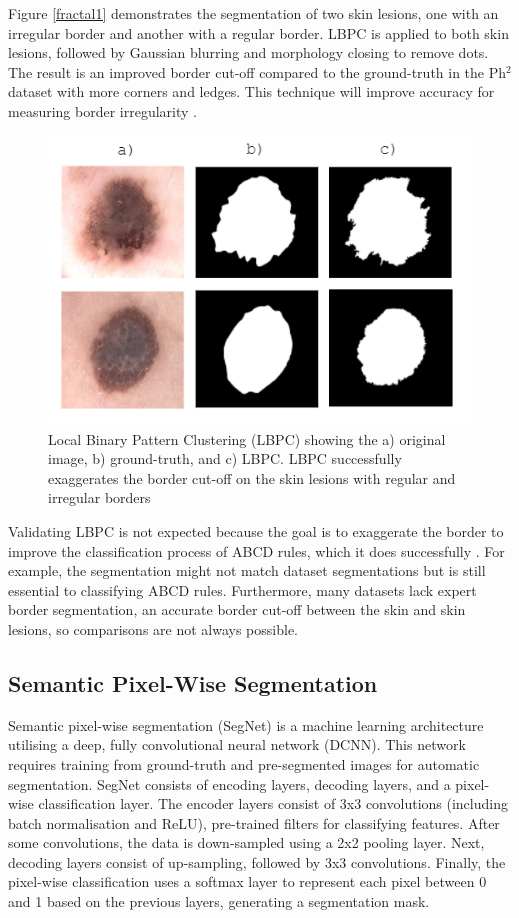 Figure \ref{fractal1} demonstrates the segmentation of two skin lesions, one with an irregular border and another with a regular border. LBPC is applied to both skin lesions, followed by Gaussian blurring and morphology closing to remove dots. The result is an improved border cut-off compared to the ground-truth in the Ph$^2$ dataset with more corners and ledges. This technique will improve accuracy for measuring border irregularity \cite{Pereira2020}.

\begin{figure}
\centering
\includegraphics[scale=1.2]{images/borders.PNG}
\caption{Local Binary Pattern Clustering (LBPC) showing the a) original image, b) ground-truth, and c) LBPC. LBPC successfully exaggerates the border cut-off on the skin lesions with regular and irregular borders} 
\end{figure} \label{fractal1}

Validating LBPC is not expected because the goal is to exaggerate the border to improve the classification process of ABCD rules, which it does successfully \cite{Pereira2020, Kaya2016}. For example, the segmentation might not match dataset segmentations but is still essential to classifying ABCD rules. Furthermore, many datasets lack expert border segmentation, an accurate border cut-off between the skin and skin lesions, so comparisons are not always possible.

\subsection{Semantic Pixel-Wise Segmentation}
Semantic pixel-wise segmentation (SegNet) is a machine learning architecture utilising a deep, fully convolutional neural network (DCNN). This network requires training from ground-truth and pre-segmented images for automatic segmentation. SegNet consists of encoding layers, decoding layers, and a pixel-wise classification layer. The encoder layers consist of 3x3 convolutions (including batch normalisation and ReLU), pre-trained filters for classifying features. After some convolutions, the data is down-sampled using a 2x2 pooling layer. Next, decoding layers consist of up-sampling, followed by 3x3 convolutions. Finally, the pixel-wise classification uses a softmax layer to represent each pixel between 0 and 1 based on the previous layers, generating a segmentation mask.

